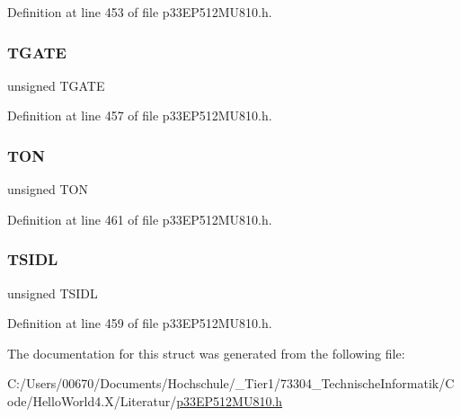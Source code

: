 Definition at line 453 of file p33\+E\+P512\+M\+U810.\+h.

\mbox{\label{structtag_t8_c_o_n_b_i_t_s_a35b6e4b591a8bd20e026168399eb0e6a}} 
\subsubsection{\texorpdfstring{T\+G\+A\+TE}{TGATE}}
{\footnotesize\ttfamily unsigned T\+G\+A\+TE}



Definition at line 457 of file p33\+E\+P512\+M\+U810.\+h.

\mbox{\label{structtag_t8_c_o_n_b_i_t_s_a8c2a094047d1019ce1c5b25ea8cff9b3}} 
\subsubsection{\texorpdfstring{T\+ON}{TON}}
{\footnotesize\ttfamily unsigned T\+ON}



Definition at line 461 of file p33\+E\+P512\+M\+U810.\+h.

\mbox{\label{structtag_t8_c_o_n_b_i_t_s_a4971b881615ef42703b5b78179fcda3d}} 
\subsubsection{\texorpdfstring{T\+S\+I\+DL}{TSIDL}}
{\footnotesize\ttfamily unsigned T\+S\+I\+DL}



Definition at line 459 of file p33\+E\+P512\+M\+U810.\+h.



The documentation for this struct was generated from the following file\+:\begin{DoxyCompactItemize}
\item 
C\+:/\+Users/00670/\+Documents/\+Hochschule/\+\_\+\+Tier1/73304\+\_\+\+Technische\+Informatik/\+Code/\+Hello\+World4.\+X/\+Literatur/\hyperlink{p33_e_p512_m_u810_8h}{p33\+E\+P512\+M\+U810.\+h}\end{DoxyCompactItemize}
